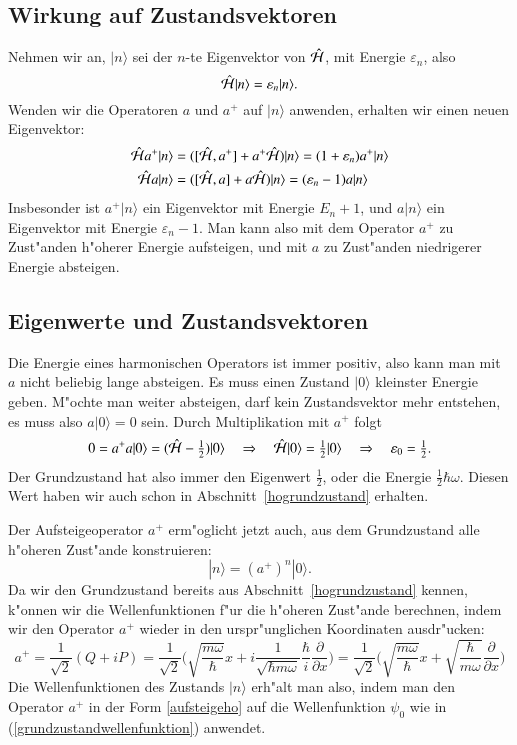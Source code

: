 \subsection{Wirkung auf Zustandsvektoren}
Nehmen wir an, $|n\rangle$ sei der $n$-te Eigenvektor von $\hat{\cal H}$,
mit Energie $\varepsilon_n$, also
\[
\hat{\cal H}|n\rangle = \varepsilon_n|n\rangle.
\]
Wenden wir die Operatoren $a$ und $a^+$ auf $|n\rangle$ anwenden, erhalten
wir einen neuen Eigenvektor:
\begin{align*}
\hat{\cal H}a^+|n\rangle
&=
([\hat{\cal H}, a^+] + a^+\hat{\cal H})|n\rangle
=
(1 + \varepsilon_n)a^+|n\rangle
\\
\hat{\cal H}a|n\rangle
&=
([\hat{\cal H}, a] + a\hat{\cal H})|n\rangle
=
(\varepsilon_n - 1)a|n\rangle
\end{align*}
Insbesonder ist $a^+|n\rangle$ ein Eigenvektor mit Energie
$E_n+1$, und $a|n\rangle$ ein Eigenvektor mit Energie $\varepsilon_n-1$.
Man kann also mit dem Operator $a^+$ zu Zust"anden h"oherer Energie
aufsteigen, und mit $a$ zu Zust"anden niedrigerer Energie absteigen.

\subsection{Eigenwerte und Zustandsvektoren}
Die Energie eines harmonischen Operators ist immer positiv,
also kann man mit $a$ nicht beliebig lange absteigen. Es muss einen
Zustand $|0\rangle$ kleinster Energie geben. M"ochte man weiter
absteigen, darf kein Zustandsvektor mehr entstehen, es muss also
$a|0\rangle=0$ sein. Durch Multiplikation mit $a^+$ folgt
\[
0=a^+a|0\rangle=(\hat{\cal H}-\textstyle\frac12)|0\rangle
\quad
\Rightarrow
\quad
\hat{\cal H}|0\rangle=\frac12|0\rangle
\quad
\Rightarrow
\quad
\varepsilon_0=\frac12.
\]
Der Grundzustand hat also immer den Eigenwert $\frac12$, oder die
Energie $\frac12\hbar\omega$. Diesen Wert haben wir auch schon in
Abschnitt~\ref{hogrundzustand} erhalten.

Der Aufsteigeoperator $a^+$ erm"oglicht jetzt auch, aus dem Grundzustand
alle h"oheren Zust"ande konstruieren:
\[
|n\rangle = (a^+)^n|0\rangle.
\]
Da wir den Grundzustand bereits aus Abschnitt~\ref{hogrundzustand} kennen,
k"onnen wir die Wellenfunktionen f"ur die h"oheren Zust"ande berechnen,
indem wir den Operator $a^+$ wieder in den urspr"unglichen Koordinaten
ausdr"ucken:
\begin{equation}
a^+=\frac1{\sqrt{2}}(Q+iP)
=
\frac1{\sqrt{2}}\biggl(
\sqrt{\frac{m\omega}{\hbar}}x
+i
\frac{1}{\sqrt{\hbar m\omega}}\frac{\hbar}{i}\frac{\partial}{\partial x}
\biggr)
=
\frac1{\sqrt{2}}
\biggl(
\sqrt{\frac{m\omega}{\hbar}}x
+
\sqrt{\frac{\hbar}{m\omega}}\frac{\partial}{\partial x}
\biggr)
\label{aufsteigeho}
\end{equation}
Die Wellenfunktionen des Zustands $|n\rangle$ erh"alt man also, indem
man den Operator $a^+$ in der Form \ref{aufsteigeho} auf die Wellenfunktion
$\psi_0$ wie in (\ref{grundzustandwellenfunktion}) anwendet.

